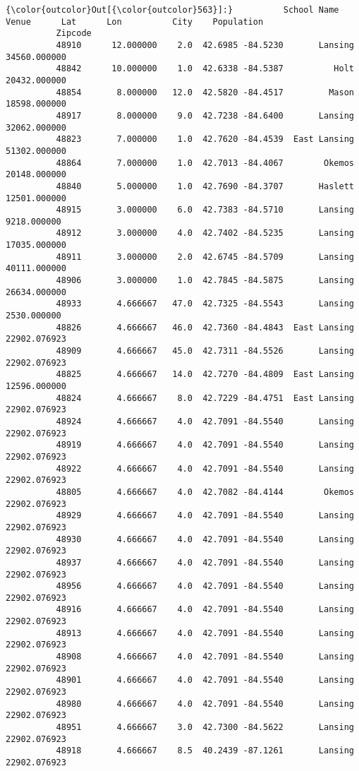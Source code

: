 \documentclass[11pt]{article}
\begin{document}
\begin{Verbatim}[commandchars=\\\{\}]
{\color{outcolor}Out[{\color{outcolor}563}]:}          School Name  Venue      Lat      Lon          City    Population
          Zipcode                                                                  
          48910      12.000000    2.0  42.6985 -84.5230       Lansing  34560.000000
          48842      10.000000    1.0  42.6338 -84.5387          Holt  20432.000000
          48854       8.000000   12.0  42.5820 -84.4517         Mason  18598.000000
          48917       8.000000    9.0  42.7238 -84.6400       Lansing  32062.000000
          48823       7.000000    1.0  42.7620 -84.4539  East Lansing  51302.000000
          48864       7.000000    1.0  42.7013 -84.4067        Okemos  20148.000000
          48840       5.000000    1.0  42.7690 -84.3707       Haslett  12501.000000
          48915       3.000000    6.0  42.7383 -84.5710       Lansing   9218.000000
          48912       3.000000    4.0  42.7402 -84.5235       Lansing  17035.000000
          48911       3.000000    2.0  42.6745 -84.5709       Lansing  40111.000000
          48906       3.000000    1.0  42.7845 -84.5875       Lansing  26634.000000
          48933       4.666667   47.0  42.7325 -84.5543       Lansing   2530.000000
          48826       4.666667   46.0  42.7360 -84.4843  East Lansing  22902.076923
          48909       4.666667   45.0  42.7311 -84.5526       Lansing  22902.076923
          48825       4.666667   14.0  42.7270 -84.4809  East Lansing  12596.000000
          48824       4.666667    8.0  42.7229 -84.4751  East Lansing  22902.076923
          48924       4.666667    4.0  42.7091 -84.5540       Lansing  22902.076923
          48919       4.666667    4.0  42.7091 -84.5540       Lansing  22902.076923
          48922       4.666667    4.0  42.7091 -84.5540       Lansing  22902.076923
          48805       4.666667    4.0  42.7082 -84.4144        Okemos  22902.076923
          48929       4.666667    4.0  42.7091 -84.5540       Lansing  22902.076923
          48930       4.666667    4.0  42.7091 -84.5540       Lansing  22902.076923
          48937       4.666667    4.0  42.7091 -84.5540       Lansing  22902.076923
          48956       4.666667    4.0  42.7091 -84.5540       Lansing  22902.076923
          48916       4.666667    4.0  42.7091 -84.5540       Lansing  22902.076923
          48913       4.666667    4.0  42.7091 -84.5540       Lansing  22902.076923
          48908       4.666667    4.0  42.7091 -84.5540       Lansing  22902.076923
          48901       4.666667    4.0  42.7091 -84.5540       Lansing  22902.076923
          48980       4.666667    4.0  42.7091 -84.5540       Lansing  22902.076923
          48951       4.666667    3.0  42.7300 -84.5622       Lansing  22902.076923
          48918       4.666667    8.5  40.2439 -87.1261       Lansing  22902.076923
\end{Verbatim}
            
\end{document}
